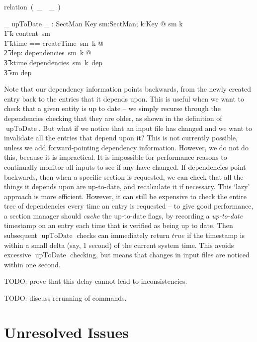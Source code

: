 \documentclass{llncs} %
\newcommand{\relation}{\mbox{relation }}
\newcommand{\varg}{~\_~}
\begin{document}
\newcommand{\upToDate}{\mathrel{\mbox{upToDate}}}
\begin{zed}
  \relation (\varg \upToDate \varg)
\end{zed}
\begin{axdef}
  \_ upToDate \_ : SectMan \rel Key
\where
  \forall sm:SectMan; k:Key @ sm \upToDate k \iff \\
  \t1 k \in \dom content~sm \land \\
  \t1 \exists ktime == createTime~sm~k @ \\
  \t2   \forall dep: \dom dependencies~sm~k @ \\
  \t3     ktime \before dependencies~sm~k~dep \land \\
  \t3     sm \upToDate dep
\end{axdef} 

Note that our dependency information points backwards,
from the newly created entry back to the entries that it
depends upon.  This is useful when we want to check that a
given entity is up to date -- we simply recurse through
the dependencies checking that they are older, as shown
in the definition of $\upToDate$.  But what if we notice
that an input file has changed and we want to invalidate
all the entries that depend upon it?  This is not currently
possible, unless we add forward-pointing dependency information.
However, we do not do this, because it is impractical. 
It is impossible for performance reasons to continually monitor all inputs
to see if any have changed.  If dependencies point backwards, then when a
specific section is requested, we can check that all the things it depends
upon are up-to-date, and recalculate it if necessary.  This `lazy' approach
is more efficient.  However, it can still be expensive to check the
entire tree of dependencies every time an entry is requested -- to give
good performance, a section manager should \emph{cache} the up-to-date
flags, by recording a \emph{up-to-date} timestamp on an entry each time
that is verified as being up to date.  Then subsequent $\upToDate$
checks can immediately return $true$ if the timestamp is within a
small delta (say, 1 second) of the current system time.  This avoids
excessive $\upToDate$ checking, but means that changes in input files
are noticed within one second.

TODO: prove that this delay cannot lead to inconsistencies.

TODO: discuss rerunning of commands.  


\section{Unresolved Issues}
\end{document}
